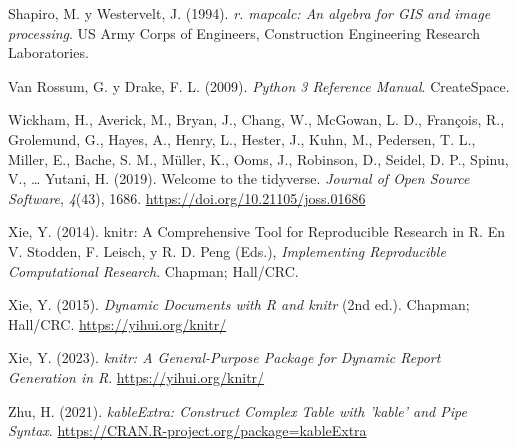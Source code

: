\documentclass[spanish]{article}
\newlength{\cslhangindent}
\newlength{\cslentryspacingunit} %
\newenvironment{CSLReferences}[2] %
 {%
  \setlength{\parindent}{0pt}
  \ifodd #1
  \let\oldpar\par
  \def\par{\hangindent=\cslhangindent\oldpar}
  \fi
  \setlength{\parskip}{#2\cslentryspacingunit}
 }%
 {}
\begin{document}
\begin{CSLReferences}{1}{0}
\leavevmode{}%
Shapiro, M. y Westervelt, J. (1994). \emph{r. mapcalc: An algebra for
GIS and image processing}. US Army Corps of Engineers, Construction
Engineering Research Laboratories.

\leavevmode{}%
Van Rossum, G. y Drake, F. L. (2009). \emph{Python 3 Reference Manual}.
CreateSpace.

\leavevmode{}%
Wickham, H., Averick, M., Bryan, J., Chang, W., McGowan, L. D.,
François, R., Grolemund, G., Hayes, A., Henry, L., Hester, J., Kuhn, M.,
Pedersen, T. L., Miller, E., Bache, S. M., Müller, K., Ooms, J.,
Robinson, D., Seidel, D. P., Spinu, V., \ldots{} Yutani, H. (2019).
Welcome to the {tidyverse}. \emph{Journal of Open Source Software},
\emph{4}(43), 1686. \url{https://doi.org/10.21105/joss.01686}

\leavevmode{}%
Xie, Y. (2014). knitr: A Comprehensive Tool for Reproducible Research in
{R}. En V. Stodden, F. Leisch, y R. D. Peng (Eds.), \emph{Implementing
Reproducible Computational Research}. Chapman; Hall/CRC.

\leavevmode{}%
Xie, Y. (2015). \emph{Dynamic Documents with {R} and knitr} (2nd ed.).
Chapman; Hall/CRC. \url{https://yihui.org/knitr/}

\leavevmode{}%
Xie, Y. (2023). \emph{knitr: A General-Purpose Package for Dynamic
Report Generation in R}. \url{https://yihui.org/knitr/}

\leavevmode{}%
Zhu, H. (2021). \emph{kableExtra: Construct Complex Table with 'kable'
and Pipe Syntax}. \url{https://CRAN.R-project.org/package=kableExtra}

\end{CSLReferences}



\end{document}
